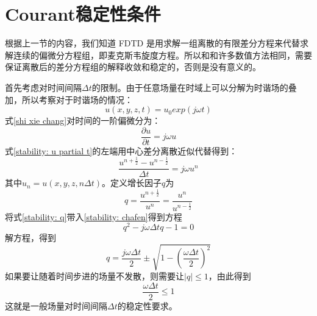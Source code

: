 \section{Courant稳定性条件}
根据上一节的内容，我们知道 FDTD 是用求解一组离散的有限差分方程来代替求解连续的偏微分方程组，即麦克斯韦旋度方程。所以和和许多数值方法相同，需要保证离散后的差分方程组的解释收敛和稳定的，否则是没有意义的。

首先考虑对时间间隔$\Delta t$的限制。由于任意场量在时域上可以分解为时谐场的叠加，所以考察对于时谐场的情况：
\begin{equation}\label{stability: shi xie chang}
u(x,y,z,t)=u_0exp(j\omega t)
\end{equation}
式\eqref{shi xie chang}对时间的一阶偏微分为：
\begin{equation}\label{stability: u partial t}
\frac{\partial u}{\partial t}=j\omega u
\end{equation}
式\eqref{stability: u partial t}的左端用中心差分离散近似代替得到：
\begin{equation}\label{stability: chafen}
\frac{u^{n+\frac{1}{2}}-u^{n-\frac{1}{2}}}{\Delta t}=j\omega u^n
\end{equation}
其中$u_n=u(x,y,z,n\Delta t)$。定义增长因子$q$为
\begin{equation}\label{stability: q}
	q=\frac{u^{n+\frac{1}{2}}}{u^n}=\frac{u^n}{u^{n-\frac{1}{2}}}
\end{equation}
将式\eqref{stability: q}带入\eqref{stability: chafen}得到方程
\begin{equation}
q^2-j\omega \Delta tq-1=0
\end{equation}
解方程，得到
\begin{equation}
q=\frac{j\omega \Delta t}{2}\pm\sqrt{1-\left(\frac{\omega \Delta  t}{2}\right)^2}
\end{equation}
如果要让随着时间步进的场量不发散，则需要让$|q|\leqslant 1$，由此得到
\begin{equation}\label{stability: dt}
\frac{\omega \Delta t}{2}\leqslant 1
\end{equation}
这就是一般场量对时间间隔$\Delta t$的稳定性要求。


